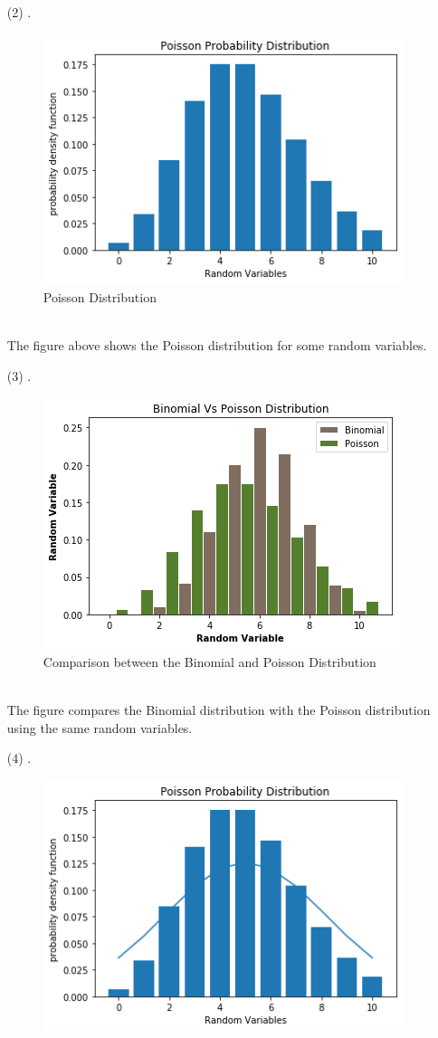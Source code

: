\documentclass[12pt,a4paper]{article}
\begin{document}
\begin{itemize}
\item[(2)]
.\\
\begin{figure}[h!]
\centering
\includegraphics[scale=0.8]{Poisson.png}
\caption{Poisson Distribution}
\end{figure}
\\
The figure above shows the Poisson distribution for some random variables.
\newpage
\item[(3)]
.\\
\begin{figure}[h!]
\centering
\includegraphics[scale=0.8]{BinPos.png}
\caption{Comparison between the Binomial and Poisson Distribution}
\end{figure}
\\
The figure compares the Binomial distribution with the Poisson distribution using the same random variables.
\item[(4)]
.\\
\begin{figure}[h!]
\centering
\includegraphics[scale=0.8]{NormalCurve.png}

\end{figure}
\end{itemize}
\end{document}
